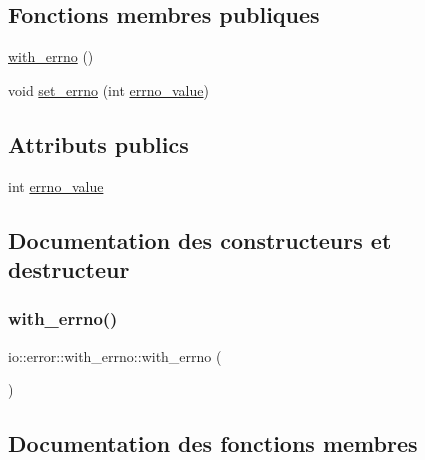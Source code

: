 \subsection*{Fonctions membres publiques}
\begin{DoxyCompactItemize}
\item 
\hyperlink{structio_1_1error_1_1with__errno_a32a76a42097cfdfb2793511082eb0f93}{with\+\_\+errno} ()
\item 
void \hyperlink{structio_1_1error_1_1with__errno_a572cfa4b4a96792cd1d17dc9ad2eb5a9}{set\+\_\+errno} (int \hyperlink{structio_1_1error_1_1with__errno_a99dcacba02cb53351fe64d7e064406be}{errno\+\_\+value})
\end{DoxyCompactItemize}
\subsection*{Attributs publics}
\begin{DoxyCompactItemize}
\item 
int \hyperlink{structio_1_1error_1_1with__errno_a99dcacba02cb53351fe64d7e064406be}{errno\+\_\+value}
\end{DoxyCompactItemize}


\subsection{Documentation des constructeurs et destructeur}
\mbox{\label{structio_1_1error_1_1with__errno_a32a76a42097cfdfb2793511082eb0f93}} 
\subsubsection{\texorpdfstring{with\+\_\+errno()}{with\_errno()}}
{\footnotesize\ttfamily io\+::error\+::with\+\_\+errno\+::with\+\_\+errno (\begin{DoxyParamCaption}{ }\end{DoxyParamCaption})\hspace{0.3cm}{\ttfamily [inline]}}



\subsection{Documentation des fonctions membres}
\mbox{\label{structio_1_1error_1_1with__errno_a572cfa4b4a96792cd1d17dc9ad2eb5a9}} 
